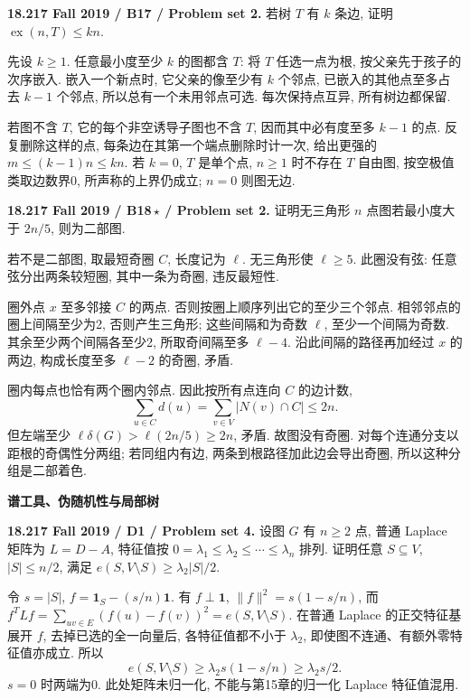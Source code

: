 \begin{exercise}\label{mit:18217-b17}
\textbf{18.217 Fall 2019 / B17 / Problem set 2.}
若树 $T$ 有 $k$ 条边, 证明 $\operatorname{ex}(n,T)\le kn$.
\end{exercise}
\begin{solution}
先设 $k\ge1$. 任意最小度至少 $k$ 的图都含 $T$: 将 $T$ 任选一点为根, 按父亲先于孩子的次序嵌入. 嵌入一个新点时, 它父亲的像至少有 $k$ 个邻点, 已嵌入的其他点至多占去 $k-1$ 个邻点, 所以总有一个未用邻点可选. 每次保持点互异, 所有树边都保留.

若图不含 $T$, 它的每个非空诱导子图也不含 $T$, 因而其中必有度至多 $k-1$ 的点. 反复删除这样的点, 每条边在其第一个端点删除时计一次, 给出更强的 $m\le(k-1)n\le kn$. 若 $k=0$, $T$ 是单个点, $n\ge1$ 时不存在 $T$ 自由图, 按空极值类取边数界0, 所声称的上界仍成立; $n=0$ 则图无边.
\end{solution}

\begin{exercise}\label{mit:18217-b18}
\textbf{18.217 Fall 2019 / B18\,$\star$ / Problem set 2.}
证明无三角形 $n$ 点图若最小度大于 $2n/5$, 则为二部图.
\end{exercise}
\begin{solution}
若不是二部图, 取最短奇圈 $C$, 长度记为 $\ell$. 无三角形使 $\ell\ge5$. 此圈没有弦: 任意弦分出两条较短圈, 其中一条为奇圈, 违反最短性.

圈外点 $x$ 至多邻接 $C$ 的两点. 否则按圈上顺序列出它的至少三个邻点. 相邻邻点的圈上间隔至少为2, 否则产生三角形; 这些间隔和为奇数 $\ell$, 至少一个间隔为奇数. 其余至少两个间隔各至少2, 所取奇间隔至多 $\ell-4$. 沿此间隔的路径再加经过 $x$ 的两边, 构成长度至多 $\ell-2$ 的奇圈, 矛盾.

圈内每点也恰有两个圈内邻点. 因此按所有点连向 $C$ 的边计数,
\[
\sum_{u\in C}d(u)=\sum_{v\in V}|N(v)\cap C|\le2n.
\]
但左端至少 $\ell\delta(G)>\ell(2n/5)\ge2n$, 矛盾. 故图没有奇圈. 对每个连通分支以距根的奇偶性分两组; 若同组内有边, 两条到根路径加此边会导出奇圈, 所以这种分组是二部着色.
\end{solution}

\par\medskip\noindent\textbf{谱工具、伪随机性与局部树}\par
\begin{exercise}\label{mit:18217-d1}
\textbf{18.217 Fall 2019 / D1 / Problem set 4.}
设图 $G$ 有 $n\ge2$ 点, 普通 Laplace 矩阵为 $L=D-A$, 特征值按 $0=\lambda_1\le\lambda_2\le\cdots\le\lambda_n$ 排列. 证明任意 $S\subseteq V$, $|S|\le n/2$, 满足 $e(S,V\setminus S)\ge\lambda_2|S|/2$.
\end{exercise}
\begin{solution}
令 $s=|S|$, $f=\mathbf1_S-(s/n)\mathbf1$. 有 $f\perp\mathbf1$, $\|f\|^2=s(1-s/n)$, 而
$f^TLf=\sum_{uv\in E}(f(u)-f(v))^2=e(S,V\setminus S)$.
在普通 Laplace 的正交特征基展开 $f$, 去掉已选的全一向量后, 各特征值都不小于 $\lambda_2$, 即使图不连通、有额外零特征值亦成立. 所以
\[
e(S,V\setminus S)\ge\lambda_2s(1-s/n)\ge\lambda_2s/2.
\]
$s=0$ 时两端为0. 此处矩阵未归一化, 不能与第15章的归一化 Laplace 特征值混用.
\end{solution}

